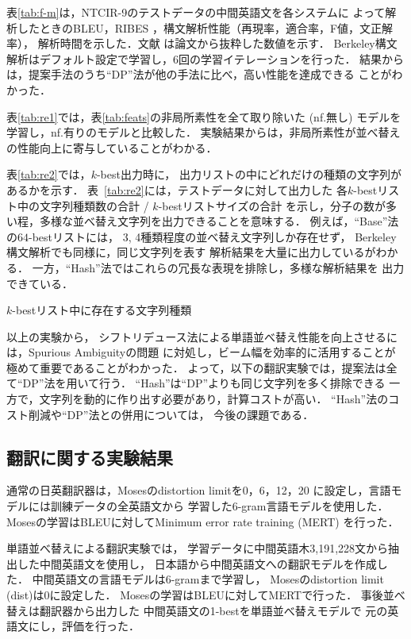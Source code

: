 \documentclass[japanese]{jnlp_1.4}
\begin{document}
表\ref{tab:f-m}は，NTCIR-9のテストデータの中間英語文を各システムに
よって解析したときのBLEU，RIBES \cite{Isozaki:10}，構文解析性能（再現率，適合率，F値，文正解率），
解析時間を示した．文献 \cite{Goto:12}は論文から抜粋した数値を示す．
Berkeley構文解析はデフォルト設定で学習し，6回の学習イテレーションを行った．
結果からは，提案手法のうち``DP''法が他の手法に比べ，高い性能を達成できる
ことがわかった．

表\ref{tab:re1}では，表\ref{tab:feats}の非局所素性を全て取り除いた (nf.無し)
モデルを学習し，nf.有りのモデルと比較した．
実験結果からは，非局所素性が並べ替えの性能向上に寄与していることがわかる．

表\ref{tab:re2}では，$k$-best出力時に，
出力リストの中にどれだけの種類の文字列があるかを示す．
表~\ref{tab:re2}には，テストデータに対して出力した
各$k$-bestリスト中の文字列種類数の合計 / $k$-bestリストサイズの合計
を示し，分子の数が多い程，多様な並べ替え文字列を出力できることを意味する．
例えば，``Base''法の$64$-bestリストには，
3, 4種類程度の並べ替え文字列しか存在せず，
Berkeley構文解析でも同様に，同じ文字列を表す
解析結果を大量に出力しているがわかる．
一方，``Hash''法ではこれらの冗長な表現を排除し，多様な解析結果を
出力できている．

\begin{table}[t]
\caption{$k$-bestリスト中に存在する文字列種類}
\label{tab:re2}

\end{table}

以上の実験から，
シフトリデュース法による単語並べ替え性能を向上させるには，Spurious Ambiguityの問題
に対処し，ビーム幅を効率的に活用することが極めて重要であることがわかった．
よって，以下の翻訳実験では，提案法は全て``DP''法を用いて行う．
``Hash''は``DP''よりも同じ文字列を多く排除できる
一方で，文字列を動的に作り出す必要があり，計算コストが高い．
``Hash''法のコスト削減や``DP''法との併用については，
今後の課題である．


\subsection{翻訳に関する実験結果}

通常の日英翻訳器は，Mosesのdistortion limitを0，6，12，20
に設定し，言語モデルには訓練データの全英語文から
学習した6-gram言語モデルを使用した．
Mosesの学習はBLEUに対してMinimum error
rate training (MERT) \cite{Och:03}を行った．

単語並べ替えによる翻訳実験では，
学習データに中間英語木3,191,228文から抽出した中間英語文を使用し，
日本語から中間英語文への翻訳モデルを作成した．
中間英語文の言語モデルは6-gramまで学習し，
Mosesのdistortion limit (dist)は0に設定した．
Mosesの学習はBLEUに対してMERTで行った．
事後並べ替えは翻訳器から出力した
中間英語文の1-bestを単語並べ替えモデルで
元の英語文にし，評価を行った．
\end{document}
